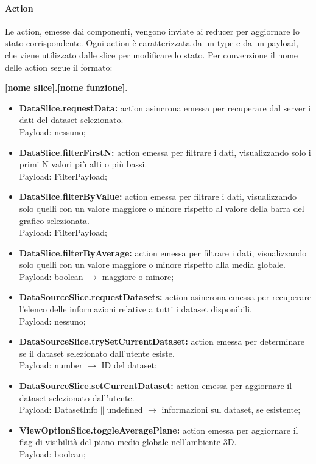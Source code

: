 \paragraph{Action}
Le action, emesse dai componenti, vengono inviate ai reducer per aggiornare lo
stato corrispondente. Ogni action è caratterizzata da un type e da un payload,
che viene utilizzato dalle slice per modificare lo stato. Per convenzione il
nome delle action segue il formato: \\
\begin{center}
      \textbf{[nome slice].[nome funzione]}.
\end{center}
\begin{itemize}
      \item \textbf{DataSlice.requestData:} action asincrona emessa per recuperare dal server i dati del dataset selezionato. \\ Payload: nessuno;
      \item \textbf{DataSlice.filterFirstN:} action emessa per filtrare i dati, visualizzando solo i primi N valori più alti o più bassi. \\ Payload: FilterPayload;
      \item \textbf{DataSlice.filterByValue:} action emessa per filtrare i dati, visualizzando solo quelli con un valore maggiore o minore rispetto al valore della barra del grafico selezionata.\\ Payload: FilterPayload;
      \item \textbf{DataSlice.filterByAverage:} action emessa per filtrare i dati, visualizzando solo quelli con un valore maggiore o minore rispetto alla media globale. \\ Payload: boolean $\rightarrow$ maggiore o minore;
      \item \textbf{DataSourceSlice.requestDatasets:} action asincrona emessa per recuperare l'elenco delle informazioni relative a tutti i dataset disponibili. \\ Payload: nessuno;
      \item \textbf{DataSourceSlice.trySetCurrentDataset:} action emessa per determinare se il dataset selezionato dall'utente esiste. \\ Payload: number $\rightarrow$ ID del dataset;
      \item \textbf{DataSourceSlice.setCurrentDataset:} action emessa per aggiornare il dataset selezionato dall'utente. \\ Payload: DatasetInfo$\|$undefined $\rightarrow$ informazioni sul dataset, se esistente;
      \item \textbf{ViewOptionSlice.toggleAveragePlane:} action emessa per aggiornare il flag di visibilità del piano medio globale nell'ambiente 3D. \\ Payload: boolean;

\end{itemize}
